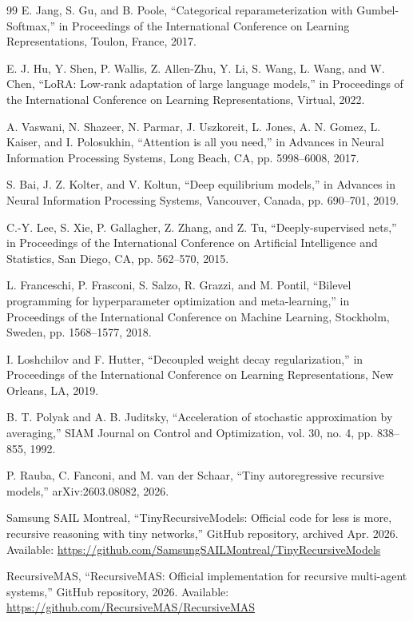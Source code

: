 \documentclass[10pt,a4paper,twocolumn]{article}
\begin{document}
\begin{thebibliography}{99}
E. Jang, S. Gu, and B. Poole, ``Categorical reparameterization with Gumbel-Softmax,'' in Proceedings of the International Conference on Learning Representations, Toulon, France, 2017.

E. J. Hu, Y. Shen, P. Wallis, Z. Allen-Zhu, Y. Li, S. Wang, L. Wang, and W. Chen, ``LoRA: Low-rank adaptation of large language models,'' in Proceedings of the International Conference on Learning Representations, Virtual, 2022.

A. Vaswani, N. Shazeer, N. Parmar, J. Uszkoreit, L. Jones, A. N. Gomez, L. Kaiser, and I. Polosukhin, ``Attention is all you need,'' in Advances in Neural Information Processing Systems, Long Beach, CA, pp. 5998--6008, 2017.

S. Bai, J. Z. Kolter, and V. Koltun, ``Deep equilibrium models,'' in Advances in Neural Information Processing Systems, Vancouver, Canada, pp. 690--701, 2019.

C.-Y. Lee, S. Xie, P. Gallagher, Z. Zhang, and Z. Tu, ``Deeply-supervised nets,'' in Proceedings of the International Conference on Artificial Intelligence and Statistics, San Diego, CA, pp. 562--570, 2015.

L. Franceschi, P. Frasconi, S. Salzo, R. Grazzi, and M. Pontil, ``Bilevel programming for hyperparameter optimization and meta-learning,'' in Proceedings of the International Conference on Machine Learning, Stockholm, Sweden, pp. 1568--1577, 2018.

I. Loshchilov and F. Hutter, ``Decoupled weight decay regularization,'' in Proceedings of the International Conference on Learning Representations, New Orleans, LA, 2019.

B. T. Polyak and A. B. Juditsky, ``Acceleration of stochastic approximation by averaging,'' SIAM Journal on Control and Optimization, vol. 30, no. 4, pp. 838--855, 1992.

P. Rauba, C. Fanconi, and M. van der Schaar, ``Tiny autoregressive recursive models,'' arXiv:2603.08082, 2026.

Samsung SAIL Montreal, ``TinyRecursiveModels: Official code for less is more, recursive reasoning with tiny networks,'' GitHub repository, archived Apr. 2026. Available: \url{https://github.com/SamsungSAILMontreal/TinyRecursiveModels}

RecursiveMAS, ``RecursiveMAS: Official implementation for recursive multi-agent systems,'' GitHub repository, 2026. Available: \url{https://github.com/RecursiveMAS/RecursiveMAS}
\end{thebibliography}
\end{document}
